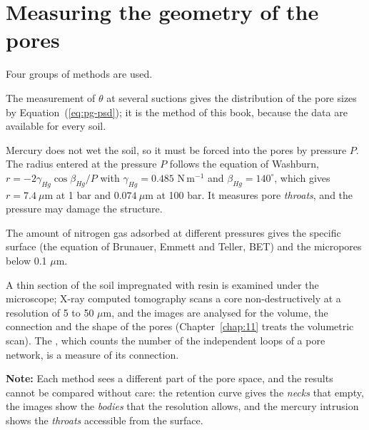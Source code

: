 \section{Measuring the geometry of the pores}
Four groups of methods are used.
\begin{exlist}
\item {} The measurement of $\theta$ at several suctions gives the distribution of the pore sizes by Equation~(\ref{eq:pg-psd}); it is the method of this book, because the data are available for every soil.
\item {} Mercury does not wet the soil, so it must be forced into the pores by pressure $P$. The radius entered at the pressure $P$ follows the equation of Washburn, $r=-2\gamma_{Hg}\cos\beta_{Hg}/P$ with $\gamma_{Hg}=0.485$ N\,m$^{-1}$ and $\beta_{Hg}=140^\circ$, which gives $r=7.4\ \mu$m at 1 bar and $0.074\ \mu$m at 100 bar. It measures pore \emph{throats}, and the pressure may damage the structure.
\item {} The amount of nitrogen gas adsorbed at different pressures gives the specific surface (the equation of Brunauer, Emmett and Teller, BET) and the micropores below 0.1 $\mu$m.
\item {} A thin section of the soil impregnated with resin is examined under the microscope; X-ray computed tomography scans a core non-destructively at a resolution of 5 to 50 $\mu$m, and the images are analysed for the volume, the connection and the shape of the pores (Chapter~\ref{chap:11} treats the volumetric scan). The , which counts the number of the independent loops of a pore network, is a measure of its connection.
\end{exlist}
\noindent \textbf{Note:} Each method sees a different part of the pore space, and the results cannot be compared without care: the retention curve gives the \emph{necks} that empty, the images show the \emph{bodies} that the resolution allows, and the mercury intrusion shows the \emph{throats} accessible from the surface.

